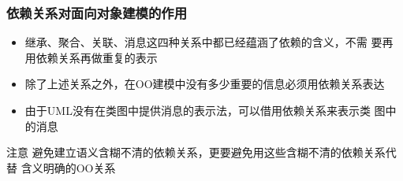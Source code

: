 \documentclass[compress]{beamer}
\begin{document}
\begin{frame}
  \frametitle{依赖关系对面向对象建模的作用}
  \begin{itemize}
    \item 继承、聚合、关联、消息这四种关系中都已经蕴涵了依赖的含义，不需
      要再用依赖关系再做重复的表示

    \item 除了上述关系之外，在OO建模中没有多少重要的信息必须用依赖关系表达
    \item 由于UML没有在类图中提供消息的表示法，可以借用依赖关系来表示类
      图中的消息
  \end{itemize}
  \begin{alertblock}{注意}
    避免建立语义含糊不清的依赖关系，更要避免用这些含糊不清的依赖关系代替
    含义明确的OO关系
  \end{alertblock}
\end{frame}
\end{document}
